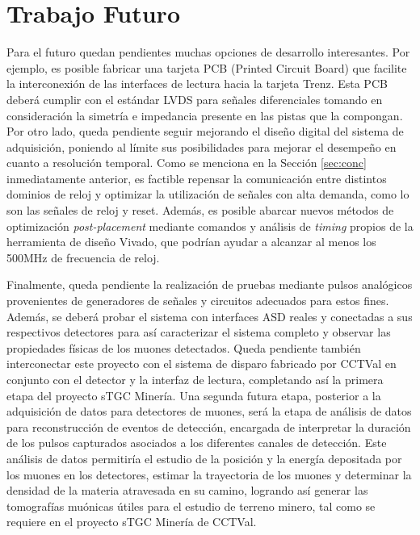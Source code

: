 \section{Trabajo Futuro}

Para el futuro quedan pendientes muchas opciones de desarrollo interesantes. Por ejemplo, es posible fabricar una tarjeta PCB (Printed Circuit Board) que facilite la interconexión de las interfaces de lectura hacia la tarjeta Trenz. Esta PCB deberá cumplir con el estándar LVDS para señales diferenciales tomando en consideración la simetría e impedancia presente en las pistas que la compongan. Por otro lado, queda pendiente seguir mejorando el diseño digital del sistema de adquisición, poniendo al límite sus posibilidades para mejorar el desempeño en cuanto a resolución temporal. Como se menciona en la Sección \ref{sec:conc} inmediatamente anterior, es factible repensar la comunicación entre distintos dominios de reloj y optimizar la utilización de señales con alta demanda, como lo son las señales de reloj y reset. Además, es posible abarcar nuevos métodos de optimización \textit{post-placement} mediante comandos y análisis de \textit{timing}\cite{XilinxUltraFastGuide} propios de la herramienta de diseño Vivado, que podrían ayudar a alcanzar al menos los 500MHz de frecuencia de reloj.

Finalmente, queda pendiente la realización de pruebas mediante pulsos analógicos provenientes de generadores de señales y circuitos adecuados para estos fines. Además, se deberá probar el sistema con interfaces ASD reales y conectadas a sus respectivos detectores para así caracterizar el sistema completo y observar las propiedades físicas de los muones detectados. Queda pendiente también interconectar este proyecto con el sistema de disparo\cite{Oyanadel2020SistemaSTGC} fabricado por CCTVal en conjunto con el detector y la interfaz de lectura, completando así la primera etapa del proyecto sTGC Minería. Una segunda futura etapa, posterior a la adquisición de datos para detectores de muones, será la etapa de análisis de datos para reconstrucción de eventos de detección, encargada de interpretar la duración de los pulsos capturados asociados a los diferentes canales de detección. Este análisis de datos permitiría el estudio de la posición y la energía depositada por los muones en los detectores, estimar la trayectoria de los muones y determinar la densidad de la materia atravesada en su camino, logrando así generar las tomografías muónicas útiles para el estudio de terreno minero, tal como se requiere en el proyecto sTGC Minería de CCTVal.

